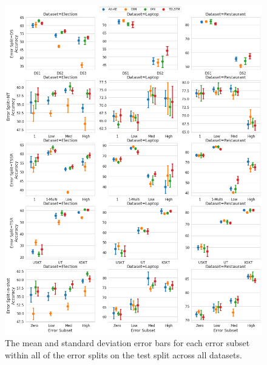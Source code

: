 \begin{figure}[ht!]
    \centering
    \includegraphics[scale=0.3]{images/augmentation/methods_performance/baseline/test_error_subsets.png}
    \caption{The mean and standard deviation error bars for each error subset within all of the error splits on the test split across all datasets.}
    \label{fig:aug_baseline_test_error_subset}
\end{figure}

